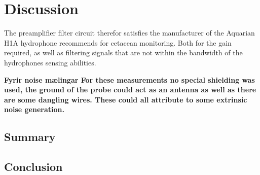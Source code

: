 \chapter{Discussion}

The preamplifier filter circuit therefor satisfies the manufacturer of the Aquarian H1A hydrophone recommends for cetacean monitoring.
Both for the gain required, as well as filtering signals that are not within the bandwidth of the hydrophones sensing abilities.

\textbf{Fyrir noise mælingar For these measurements no special shielding was used, the ground of the probe could act as an antenna as well as there are some dangling wires.
These could all attribute to some extrinsic noise generation.}



\section{Summary}


\section{Conclusion\label{sec:conclusions}}

